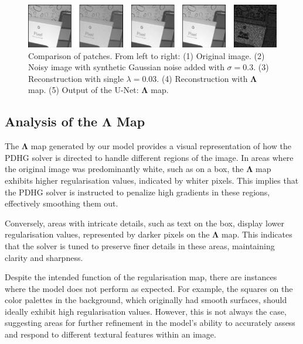 \documentclass[12pt]{article}
\begin{document}
\begin{figure}[h]
    \centering
    \includegraphics[width=1.0\linewidth]{images/cur/patch_2.png}
    \vspace{-8pt}
    
    \caption{Comparison of patches. From left to right: (1) Original image. (2) Noisy image with synthetic Gaussian noise added with $\sigma = 0.3$. (3) Reconstruction with single $\lambda = 0.03$. (4) Reconstruction with $\mathbf{\Lambda}$ map. (5) Output of the U-Net: $\mathbf{\Lambda}$ map.}
    \label{fig:compare_patches}
\end{figure}

\subsection{Analysis of the $\mathbf{\Lambda}$ Map}

The $\mathbf{\Lambda}$ map generated by our model provides a visual representation of how the PDHG solver is directed to handle different regions of the image. In areas where the original image was predominantly white, such as on a box, the $\mathbf{\Lambda}$ map exhibits higher regularisation values, indicated by whiter pixels. This implies that the PDHG solver is instructed to penalize high gradients in these regions, effectively smoothing them out.

Conversely, areas with intricate details, such as text on the box, display lower regularisation values, represented by darker pixels on the $\mathbf{\Lambda}$ map. This indicates that the solver is tuned to preserve finer details in these areas, maintaining clarity and sharpness.


Despite the intended function of the regularisation map, there are instances where the model does not perform as expected. For example, the squares on the color palettes in the background, which originally had smooth surfaces, should ideally exhibit high regularisation values. However, this is not always the case, suggesting areas for further refinement in the model's ability to accurately assess and respond to different textural features within an image.
\end{document}
